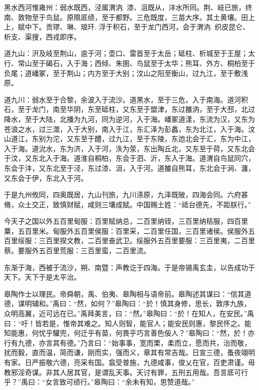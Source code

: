 \documentclass[UTF8,12pt,AutoFakeBold]{ctexart}
\begin{document}
	黑水西河惟雍州：弱水既西，泾属渭汭. 漆、沮既从，沣水所同。荆、岐已旅，终南、敦物至于鸟鼠。原隰厎绩，至于都野。三危既度，三苗大序。其土黄壤。田上上，赋中下。贡璆、琳、琅玕. 浮于积石，至于龙门西河，会于渭汭. 织皮昆仑、析支、渠搜，西戎即序。
	
	道九山：汧及岐至荆山，逾于河；壶口、雷首至于太岳；砥柱、析城至于王屋；太行、常山至于碣石，入于海；西倾、朱圉、鸟鼠至于太华；熊耳、外方、桐柏至于负尾；道嶓冢，至于荆山；内方至于大别；汶山之阳至衡山，过九江，至于敷浅原。
	
	道九川：弱水至于合黎，余波入于流沙。道黑水，至于三危，入于南海。道河积石，至于龙门，南至华阴，东至砥柱，又东至于盟津，东过雒汭，至于大邳，北过降水，至于大陆，北播为九河，同为逆河，入于海。嶓冢道漾，东流为汉，又东为苍浪之水，过三澨，入于大别，南入于江，东汇泽为彭蠡，东为北江，入于海。汶山道江，东别为沱，又东至于醴，过九江，至于东陵，东迆北会于汇，东为中江，入于海。道沇水，东为济，入于河，泆为荥，东出陶丘北，又东至于荷，又东北会于汶，又东北入于海。道淮自桐柏，东会于泗、沂，东入于海。道渭自鸟鼠同穴，东会于沣，又东北至于泾，东过漆、沮，入于河。道雒自熊耳，东北会于涧、瀍，又东会于伊，东北入于河。
	
	于是九州攸同，四奥既居，九山刊旅，九川涤原，九泽既陂，四海会同。六府甚脩，众土交正，致慎财赋，咸则三壤成赋。中国赐土姓：“祗台德先，不距朕行。”
	
	今天子之国以外五百里甸服：百里赋纳总，二百里纳铚，三百里纳秸服，四百里粟，五百里米。甸服外五百里侯服：百里采，二百里任国，三百里诸侯。侯服外五百里绥服：三百里揆文教，二百里奋武卫。绥服外五百里要服：三百里夷，二百里蔡。要服外五百里荒服：三百里蛮，二百里流。
	
	东渐于海，西被于流沙，朔、南暨：声教讫于四海。于是帝锡禹玄圭，以告成功于天下。天下于是太平治。
	
	皋陶作士以理民。帝舜朝，禹、伯夷、皋陶相与语帝前。皋陶述其谋曰：“信其道德，谋明辅和。”禹曰：“然，如何？”皋陶曰：“於！慎其身修，思长，敦序九族，众明高翼，近可远在已。”禹拜美言，曰：“然。”皋陶曰：“於！在知人，在安民。”禹曰：“吁！皆若是，惟帝其难之。知人则智，能官人；能安民则惠，黎民怀之。能知能惠，何忧乎驩兜，何迁乎有苗，何畏乎巧言善色佞人？”皋陶曰：“然，於！亦行有九德，亦言其有德。”乃言曰：“始事事，宽而栗，柔而立，愿而共，治而敬，扰而毅，直而温，简而谦，刚而实，强而义，章其有常吉哉。日宣三德，蚤夜翊明有家。日严振敬六德，亮采有国。翕受普施，九德咸事，俊乂在官，百吏肃谨。毋教邪淫奇谋。非其人居其官，是谓乱天事。天讨有罪，五刑五用哉。吾言厎可行乎？”禹曰：“女言致可绩行。”皋陶曰：“余未有知，思赞道哉。”
	
\end{document}
